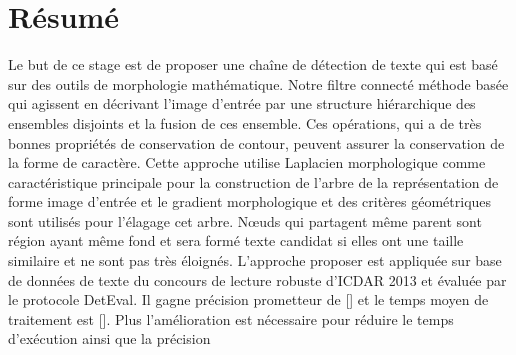 \section{Résumé}
Le but de ce stage est de proposer une chaîne de détection de texte qui est basé sur des outils de morphologie mathématique. Notre filtre connecté méthode basée qui agissent en décrivant l'image d'entrée par une structure hiérarchique des ensembles disjoints et la fusion de ces ensemble. Ces opérations, qui a de très bonnes propriétés de conservation de contour, peuvent assurer la conservation de la forme de caractère. Cette approche utilise Laplacien morphologique comme caractéristique principale pour la construction de l'arbre de la représentation de forme image d'entrée et le gradient morphologique et des critères géométriques sont utilisés pour l'élagage cet arbre. Nœuds qui partagent même parent sont région ayant même fond et sera formé texte candidat si elles ont une taille similaire et ne sont pas très éloignés. L'approche proposer est appliquée sur base de données de texte  du concours de lecture robuste d’ICDAR 2013 et évaluée par le protocole DetEval. Il gagne précision prometteur de [] et le temps moyen de traitement est []. Plus l’amélioration est nécessaire pour réduire le temps d'exécution ainsi que la précision
